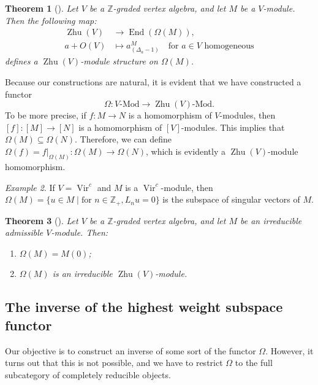 \documentclass[a4paper, 12pt, reqno]{amsart}
\newtheorem{theorem}{Theorem}[section]
\theoremstyle{remark}
\newtheorem{example}[theorem]{Example}
\numberwithin{equation}{subsection}
\DeclareMathOperator{\Vir}{Vir}
\DeclareMathOperator{\End}{End}
\DeclareMathOperator{\Zhu}{Zhu}
\begin{document}
\begin{theorem}[{\cite[Theorem 5.3]{dong_twisted_1998}}]
  \label{thr:36}
  Let $V$ be a $\mathbb{Z}$-graded vertex algebra, and let $M$ be a $V$-module.
  Then the following map:
  \begin{align*}
    \Zhu(V) &\to \End(\Omega(M)), \\
    a + O(V) &\mapsto a^M_{(\Delta_a - 1)} \quad \text{for }a \in V\text{ homogeneous}
  \end{align*}
  defines a $\Zhu(V)$-module structure on $\Omega(M)$.
\end{theorem}

Because our constructions are natural, it is evident that we have constructed a functor
\begin{equation*}
  \Omega: V\text{-Mod} \to \Zhu(V)\text{-Mod}.
\end{equation*}
To be more precise, if $f: M \to N$ is a homomorphism of $V$-modules, then $[f]: [M] \to [N]$ is a homomorphism of $[V]$-modules.
This implies that $\Omega(M) \subseteq \Omega(N)$.
Therefore, we can define $\Omega(f) = f|_{\Omega(M)}: \Omega(M) \to \Omega(N)$, which is evidently a $\Zhu(V)$-module homomorphism.

\begin{example}
  \label{exa:12}
  If $V = \Vir^c$ and $M$ is a $\Vir^c$-module, then $\Omega(M) = \{u \in M \mid \text{for }n \in \mathbb{Z}_+, L_nu = 0\}$ is the subspace of singular vectors of $M$.
\end{example}

\begin{theorem}[{\cite[Proposition 5.4]{dong_twisted_1998}}]
  \label{thr:37}
  Let $V$ be a $\mathbb{Z}$-graded vertex algebra, and let $M$ be an irreducible admissible $V$-module.
  Then:
  \begin{enumerate}
  \item $\Omega(M) = M(0)$;
  \item $\Omega(M)$ is an irreducible $\Zhu(V)$-module.
  \end{enumerate}
\end{theorem}

\subsection{The inverse of the highest weight subspace functor}
\label{sec:inverse-highe-weight}

Our objective is to construct an inverse of some sort of the functor $\Omega$.
However, it turns out that this is not possible, and we have to restrict $\Omega$ to the full subcategory of completely reducible objects.
\end{document}
